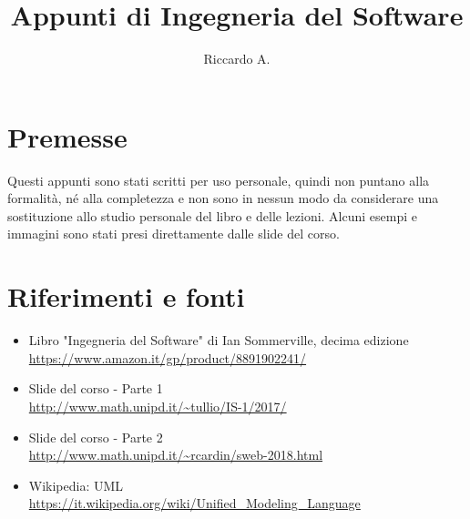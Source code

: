 

\author{Riccardo A.}
\title{Appunti di Ingegneria del Software}



\maketitle

\section*{Premesse}
Questi appunti sono stati scritti per uso personale, quindi non puntano alla formalità, né alla completezza e non sono in nessun modo da considerare una sostituzione allo studio personale del libro e delle lezioni. 
Alcuni esempi e immagini sono stati presi direttamente dalle slide del corso.

\section*{Riferimenti e fonti}
\begin{itemize}
\item Libro "Ingegneria del Software" di Ian Sommerville, decima edizione\\
\url{https://www.amazon.it/gp/product/8891902241/}
\item Slide del corso - Parte 1 \\
\url{http://www.math.unipd.it/~tullio/IS-1/2017/}
\item Slide del corso - Parte 2 \\
\url{http://www.math.unipd.it/~rcardin/sweb-2018.html}
\item Wikipedia: UML \\
\url{https://it.wikipedia.org/wiki/Unified_Modeling_Language}
\end{itemize}

\tableofcontents
\newpage



